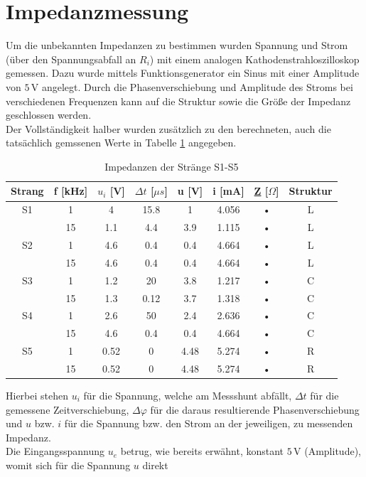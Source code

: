 \section{Impedanzmessung}
\label{sc:impedanzmessung}
Um die unbekannten Impedanzen zu bestimmen wurden Spannung und Strom (über den Spannungsabfall an $R_i$) mit einem analogen Kathodenstrahloszilloskop gemessen. Dazu wurde mittels Funktionsgenerator ein Sinus mit einer Amplitude von  $5\,$V angelegt. Durch die Phasenverschiebung und Amplitude des Stroms bei verschiedenen Frequenzen kann auf die Struktur sowie die Größe der Impedanz geschlossen werden. \\
Der Vollständigkeit halber wurden zusätzlich zu den berechneten, auch die tatsächlich gemssenen Werte in Tabelle \ref{tb:imp} angegeben. 
\begin{table}[h]
	\centering
	\begin{tabular}{|c|c||c|c||c|c|c|c|}
	\hline 
	Strang & f [kHz] & $u_i$ [V] & $\Delta t$ [$\mu s$] & u [V] & i [mA] & \underline{Z} [$\Omega$] & Struktur \\ 
	\hline 
	S1 & 1 & 4 & 15.8 & 1 & 4.056 & • & L \\ 
	\hline 
	 & 15 & 1.1 & 4.4 & 3.9 & 1.115 & • & L \\ 
	\hline 
	S2 & 1 & 4.6 & 0.4 & 0.4 & 4.664 & • & L \\ 
	\hline 
	 & 15 & 4.6 & 0.4 & 0.4 & 4.664 & • & L \\ 
	\hline 
	S3 & 1 & 1.2 & 20 & 3.8 & 1.217 & • & C \\ 
	\hline 
	 & 15 & 1.3 & 0.12 & 3.7 & 1.318 & • & C \\ 
	\hline 
	S4 & 1 & 2.6 & 50 & 2.4 & 2.636 & • & C \\ 
	\hline 
	 & 15 & 4.6 & 0.4 & 0.4 & 4.664 & • & C \\ 
	\hline 
	S5 & 1 & 0.52 & 0 & 4.48 & 5.274 & • & R \\ 
	\hline 
	 & 15 & 0.52 & 0 & 4.48 & 5.274  & • & R \\ 
	\hline 
	\end{tabular} 
	\caption{Impedanzen der Stränge S1-S5}
	\label{tb:imp}
\end{table}
Hierbei stehen $u_i$ für die Spannung, welche am Messshunt abfällt, $\Delta t$ für die gemessene Zeitverschiebung, $\Delta \varphi$ für die daraus resultierende Phasenverschiebung und $u$ bzw. $i$ für die Spannung bzw. den Strom an der jeweiligen, zu messenden Impedanz. \\
Die Eingangsspannung $u_e$ betrug, wie bereits erwähnt, konstant $5\,$V (Amplitude), womit sich für die Spannung $u$ direkt
